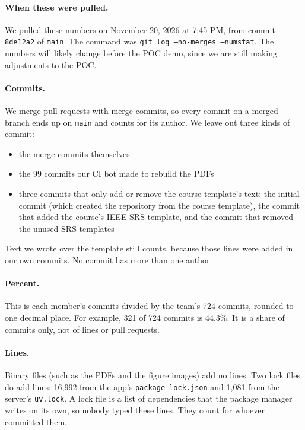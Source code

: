 \documentclass{article}
\begin{document}
\paragraph{When these were pulled.} We pulled these numbers on November 20,
2026 at 7:45 PM, from commit \texttt{8de12a2} of \texttt{main}. The command
was \texttt{git log --no-merges --numstat}. The numbers will likely change
before the POC demo, since we are still making adjustments to the POC.

\paragraph{Commits.} We merge pull requests with merge commits, so every
commit on a merged branch ends up on \texttt{main} and counts for its author.
We leave out three kinds of commit:

\begin{itemize}
\item the merge commits themselves
\item the 99 commits our CI bot made to rebuild the PDFs
\item three commits that only add or remove the course template's text: the
  initial commit (which created the repository from the course template), the
  commit that added the course's IEEE SRS template, and the commit that
  removed the unused SRS templates
\end{itemize}

Text we wrote over the template still counts, because those lines were added
in our own commits. No commit has more than one author.

\paragraph{Percent.} This is each member's commits divided by the team's 724
commits, rounded to one decimal place. For example, 321 of 724 commits is
44.3\%. It is a share of commits only, not of lines or pull requests.

\paragraph{Lines.} Binary files (such as the PDFs and the figure images) add
no lines. Two lock files do add lines: 16,992 from the app's
\texttt{package-lock.json} and 1,081 from the server's \texttt{uv.lock}. A
lock file is a list of dependencies that the package manager writes on its
own, so nobody typed these lines. They count for whoever committed them.
\end{document}
